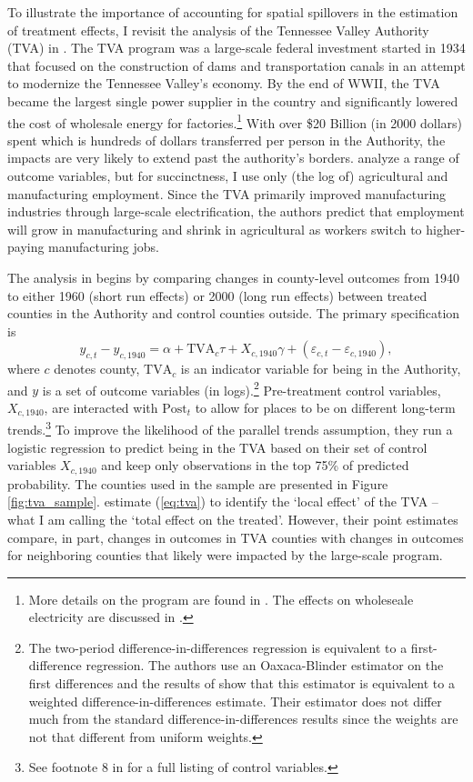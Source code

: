 \documentclass[11pt]{article}
\begin{document}
To illustrate the importance of accounting for spatial spillovers in the estimation of treatment effects, I revisit the analysis of the Tennessee Valley Authority (TVA) in \citet{Kline_Moretti_2014}. The TVA program was a large-scale federal investment started in 1934 that focused on the construction of dams and transportation canals in an attempt to modernize the Tennessee Valley's economy. By the end of WWII, the TVA became the largest single power supplier in the country and significantly lowered the cost of wholesale energy for factories.\footnote{More details on the program are found in \citet{Kline_Moretti_2014}. The effects on wholeseale electricity are discussed in \citet{Kitchens_2014}.} With over \$20 Billion (in 2000 dollars) spent which is hundreds of dollars transferred per person in the Authority, the impacts are very likely to extend past the authority's borders. \citet{Kline_Moretti_2014} analyze a range of outcome variables, but for succinctness, I use only (the log of) agricultural and manufacturing employment. Since the TVA primarily improved manufacturing industries through large-scale electrification, the authors predict that employment will grow in manufacturing and shrink in agricultural as workers switch to higher-paying manufacturing jobs. 

The analysis in \citet{Kline_Moretti_2014} begins by comparing changes in county-level outcomes from 1940 to either 1960 (short run effects) or 2000 (long run effects) between treated counties in the Authority and control counties outside. The primary specification is
\begin{equation}\label{eq:tva}
    y_{c, t} - y_{c, 1940} = \alpha + \text{TVA}_c \tau + X_{c, 1940} \gamma + (\varepsilon_{c, t} - \varepsilon_{c, 1940}),
\end{equation}
where $c$ denotes county, $\text{TVA}_c$ is an indicator variable for being in the Authority, and $y$ is a set of outcome variables (in logs).\footnote{The two-period difference-in-differences regression is equivalent to a first-difference regression. The authors use an Oaxaca-Blinder estimator on the first differences and the results of \citet{Kline_2011} show that this estimator is equivalent to a weighted difference-in-differences estimate. Their estimator does not differ much from the standard difference-in-differences results since the weights are not that different from uniform weights.} Pre-treatment control variables, $X_{c,1940}$, are interacted with $\text{Post}_t$ to allow for places to be on different long-term trends.\footnote{See footnote 8 in \citet{Kline_Moretti_2014} for a full listing of control variables.} To improve the likelihood of the parallel trends assumption, they run a logistic regression to predict being in the TVA based on their set of control variables $X_{c,1940}$ and keep only observations in the top 75\% of predicted probability. The counties used in the sample are presented in Figure \ref{fig:tva_sample}. \citet{Kline_Moretti_2014} estimate (\ref{eq:tva}) to identify the `local effect' of the TVA -- what I am calling the `total effect on the treated'. However, their point estimates compare, in part, changes in outcomes in TVA counties with changes in outcomes for neighboring counties that likely were impacted by the large-scale program. 
\end{document}
